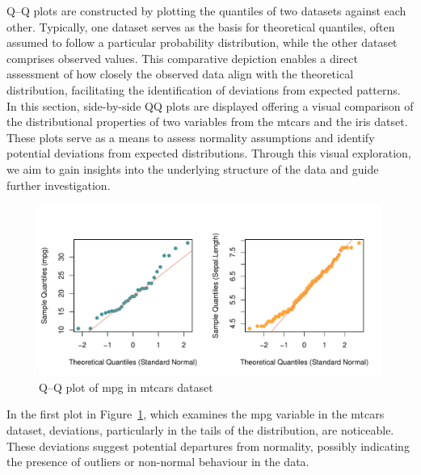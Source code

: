 \documentclass{article}\usepackage[]{graphicx}\usepackage[]{xcolor}
\makeatletter
\def\maxwidth{ %
  \ifdim\Gin@nat@width>\linewidth
    \linewidth
  \else
    \Gin@nat@width
  \fi
}
\newenvironment{knitrout}{}{} %
\numberwithin{equation}{section}
\makeatother
\begin{document}
\noindent Q–Q plots are constructed by plotting the quantiles of two datasets against each other. Typically, one dataset serves as the basis for theoretical quantiles, often assumed to follow a particular probability distribution, while the other dataset comprises observed values. This comparative depiction enables a direct assessment of how closely the observed data align with the theoretical distribution, facilitating the identification of deviations from expected patterns.\\

\noindent In this section, side-by-side QQ plots are displayed offering a visual comparison of the distributional properties of two variables from the mtcars and the iris datset. These plots serve as a means to assess normality assumptions and identify potential deviations from expected distributions. Through this visual exploration, we aim to gain insights into the underlying structure of the data and guide further investigation.\\

\begin{knitrout}\scriptsize
{}\color{fgcolor}\begin{figure}[h]

{\centering \includegraphics[width=\maxwidth]{figure/beamer-QQplots-1} 

}

\caption[Q–Q plot of mpg in mtcars dataset]{Q–Q plot of mpg in mtcars dataset}\label{fig:QQplots}
\end{figure}

\end{knitrout}

\noindent In the first plot in Figure~\ref{fig:QQplots}, which examines the mpg variable in the mtcars dataset, deviations, particularly in the tails of the distribution, are noticeable. These deviations suggest potential departures from normality, possibly indicating the presence of outliers or non-normal behaviour in the data.\\
\end{document}
